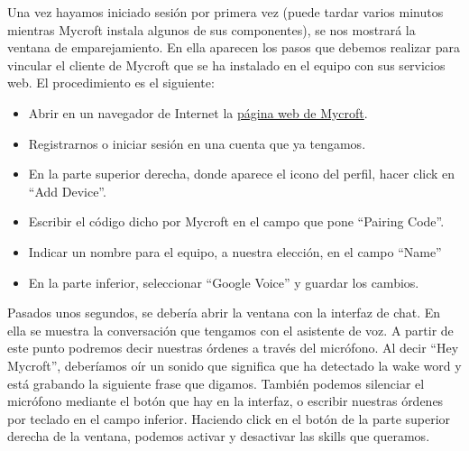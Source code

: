 Una vez hayamos iniciado sesión por primera vez (puede tardar varios minutos mientras Mycroft instala algunos de sus componentes), se nos mostrará la ventana de emparejamiento. En ella aparecen los pasos que debemos realizar para vincular el cliente de Mycroft que se ha instalado en el equipo con sus servicios web. El procedimiento es el siguiente:
\begin{itemize}
    \item Abrir en un navegador de Internet la \href{https://mycroft.ai}{página web de Mycroft}.
    \item Registrarnos o iniciar sesión en una cuenta que ya tengamos.
    \item En la parte superior derecha, donde aparece el icono del perfil, hacer click en ``Add Device''.
    \item Escribir el código dicho por Mycroft en el campo que pone ``Pairing Code''.
    \item Indicar un nombre para el equipo, a nuestra elección, en el campo ``Name''
    \item En la parte inferior, seleccionar ``Google Voice'' y guardar los cambios.
\end{itemize}



Pasados unos segundos, se debería abrir la ventana con la interfaz de chat. En ella se muestra la conversación que tengamos con el asistente de voz. A partir de este punto podremos decir nuestras órdenes a través del micrófono. Al decir ``Hey Mycroft'', deberíamos oír un sonido que significa que ha detectado la wake word y está grabando la siguiente frase que digamos. También podemos silenciar el micrófono mediante el botón que hay en la interfaz, o escribir nuestras órdenes por teclado en el campo inferior. Haciendo click en el botón de la parte superior derecha de la ventana, podemos activar y desactivar las skills que queramos.


